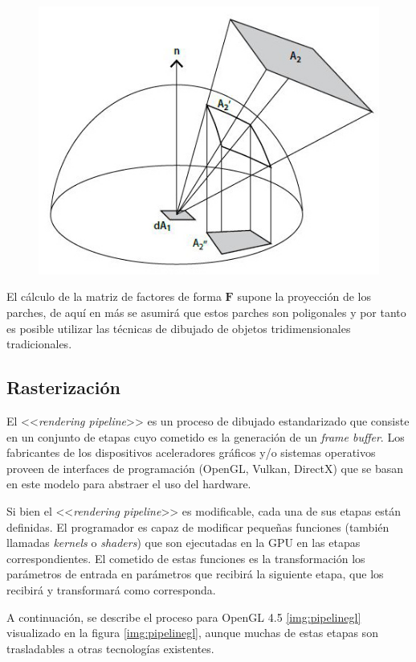 \begin{figure}[H]
	\centering
	\includegraphics[width=0.55\linewidth]{assets/nusselt}
	\label{img:nusselt}
\end{figure}

El cálculo de la matriz de factores de forma $\mathbf{F}$ supone la proyección de los parches, de aquí en más se asumirá que estos parches son poligonales y por tanto es posible utilizar las técnicas de dibujado de objetos tridimensionales tradicionales.

\subsection{Rasterización}
\label{sec:rasterizacion}

El <<\textit{rendering pipeline}>> es un proceso de dibujado estandarizado que consiste en un conjunto de etapas cuyo cometido es la generación de un \textit{frame buffer}. Los fabricantes de los dispositivos aceleradores gráficos y/o sistemas operativos proveen de interfaces de programación (OpenGL, Vulkan, DirectX) que se basan en este modelo para abstraer el uso del hardware.

Si bien el <<\textit{rendering pipeline}>> es modificable, cada una de sus etapas están definidas.  El programador es capaz de modificar pequeñas funciones (también llamadas \textit{kernels} o \textit{shaders}) que son ejecutadas en la GPU en las etapas correspondientes. El cometido de estas funciones es la transformación los parámetros de entrada en parámetros que recibirá la siguiente etapa, que los recibirá y transformará como corresponda.

A continuación, se describe el proceso para OpenGL 4.5 \ref{img:pipelinegl} visualizado en la figura \ref{img:pipelinegl}, aunque muchas de estas etapas son trasladables a otras tecnologías existentes.

